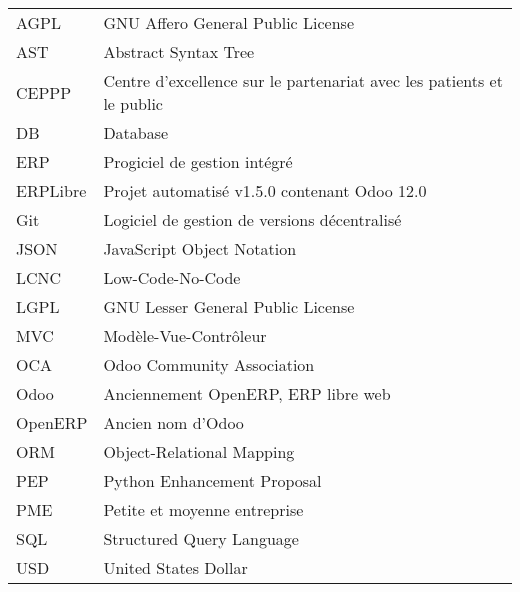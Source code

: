\chapter*{\abbrevname}
\pagestyle{pagenumber}
%
\begin{acronym}
\end{acronym}
%
\begin{longtable}{lp{5in}}
AGPL      & GNU Affero General Public License\\
AST       & Abstract Syntax Tree\\
CEPPP     & Centre d'excellence sur le partenariat avec les patients et le public\\
DB        & Database\\
ERP       & Progiciel de gestion intégré\\
ERPLibre  & Projet automatisé v1.5.0 contenant Odoo 12.0\\
Git       & Logiciel de gestion de versions décentralisé\\
JSON      & JavaScript Object Notation\\
LCNC      & Low-Code-No-Code\\
LGPL      & GNU Lesser General Public License\\
MVC       & Modèle-Vue-Contrôleur\\
OCA       & Odoo Community Association\\
Odoo      & Anciennement OpenERP, ERP libre web\\
OpenERP   & Ancien nom d'Odoo\\
ORM       & Object-Relational Mapping\\
PEP       & Python Enhancement Proposal\\
PME       & Petite et moyenne entreprise\\
SQL       & Structured Query Language\\
USD       & United States Dollar\\

\end{longtable}

